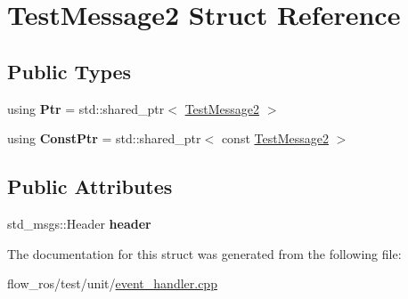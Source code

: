 \hypertarget{struct_test_message2}{}\section{Test\+Message2 Struct Reference}
\label{struct_test_message2}
\subsection*{Public Types}
\begin{DoxyCompactItemize}
\item 
\mbox{\label{struct_test_message2_a864b45356c57ef91655aabe71f249fee}} 
using {\bfseries Ptr} = std\+::shared\+\_\+ptr$<$ \hyperlink{struct_test_message2}{Test\+Message2} $>$
\item 
\mbox{\label{struct_test_message2_a1490b1301121126708856860a6aa2138}} 
using {\bfseries Const\+Ptr} = std\+::shared\+\_\+ptr$<$ const \hyperlink{struct_test_message2}{Test\+Message2} $>$
\end{DoxyCompactItemize}
\subsection*{Public Attributes}
\begin{DoxyCompactItemize}
\item 
\mbox{\label{struct_test_message2_a97d834fedcb6dbb80f316d2ff3751d8f}} 
std\+\_\+msgs\+::\+Header {\bfseries header}
\end{DoxyCompactItemize}


The documentation for this struct was generated from the following file\+:\begin{DoxyCompactItemize}
\item 
flow\+\_\+ros/test/unit/\hyperlink{event__handler_8cpp}{event\+\_\+handler.\+cpp}\end{DoxyCompactItemize}
